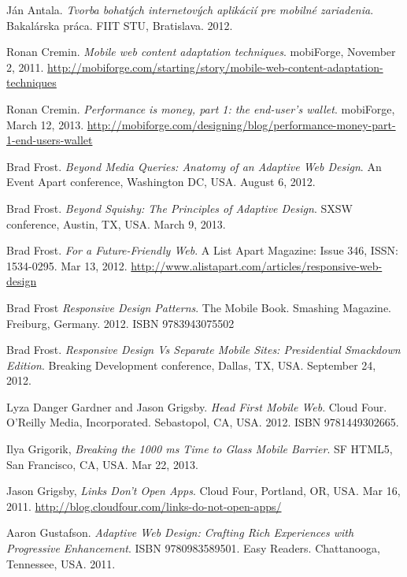 \newpage

\begin{thebibliography}{9}

  Ján Antala.
  \emph{Tvorba bohatých internetových aplikácií pre mobilné zariadenia}.
  Bakalárska práca.
  FIIT STU,
  Bratislava.
  2012.

  Ronan Cremin.
  \emph{Mobile web content adaptation techniques}.
  mobiForge,
  November 2, 2011.
  \url{http://mobiforge.com/starting/story/mobile-web-content-adaptation-techniques}

  Ronan Cremin.
  \emph{Performance is money, part 1: the end-user's wallet}.
  mobiForge,
  March 12, 2013.
  \url{http://mobiforge.com/designing/blog/performance-money-part-1-end-users-wallet}

  Brad Frost.
  \emph{Beyond Media Queries: Anatomy of an Adaptive Web Design}.
  An Event Apart conference,
  Washington DC, USA.
  August 6, 2012.

  Brad Frost.
  \emph{Beyond Squishy: The Principles of Adaptive Design}.
  SXSW conference,
  Austin, TX, USA.
  March 9, 2013.

  Brad Frost.
  \emph{For a Future-Friendly Web}.
  A List Apart Magazine: Issue 346,
  ISSN: 1534-0295.
  Mar 13, 2012.
  \url{http://www.alistapart.com/articles/responsive-web-design}

  Brad Frost
  \emph{Responsive Design Patterns}.
  The Mobile Book.
  Smashing Magazine.
  Freiburg, Germany.
  2012.
  ISBN 9783943075502

  Brad Frost.
  \emph{Responsive Design Vs Separate Mobile Sites: Presidential Smackdown Edition}.
  Breaking Development conference,
  Dallas, TX, USA.
  September 24, 2012.

  Lyza Danger Gardner and Jason Grigsby.
  \emph{Head First Mobile Web}.
  Cloud Four.
  O'Reilly Media, Incorporated.
  Sebastopol, CA, USA.
  2012.
  ISBN 9781449302665.

  Ilya Grigorik,
  \emph{Breaking the 1000 ms Time to Glass Mobile Barrier}.
  SF HTML5,
  San Francisco, CA, USA.
  Mar 22, 2013.

  Jason Grigsby,
  \emph{Links Don’t Open Apps}.
  Cloud Four,
  Portland, OR, USA.
  Mar 16, 2011.
  \url{http://blog.cloudfour.com/links-do-not-open-apps/}

  Aaron Gustafson.
  \emph{Adaptive Web Design: Crafting Rich Experiences with Progressive Enhancement}.
  ISBN 9780983589501.
  Easy Readers. 
  Chattanooga, Tennessee, USA.
  2011.


\end{thebibliography}
